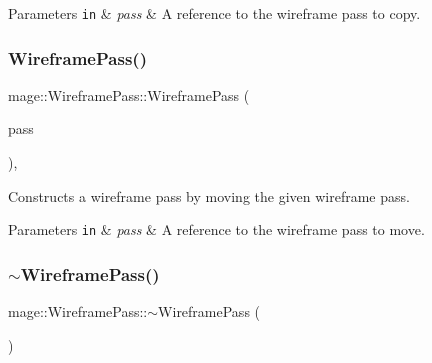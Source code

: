 \begin{DoxyParams}[1]{Parameters}
\mbox{\tt in}  & {\em pass} & A reference to the wireframe pass to copy. \\
\hline
\end{DoxyParams}
\hypertarget{classmage_1_1_wireframe_pass_afb86ef997be4e3a204ead228d6533519}{}\label{classmage_1_1_wireframe_pass_afb86ef997be4e3a204ead228d6533519} 
\subsubsection{\texorpdfstring{Wireframe\+Pass()}{WireframePass()}\hspace{0.1cm}{\footnotesize\ttfamily [3/3]}}
{\footnotesize\ttfamily mage\+::\+Wireframe\+Pass\+::\+Wireframe\+Pass (\begin{DoxyParamCaption}\item[{\hyperlink{classmage_1_1_wireframe_pass}{Wireframe\+Pass} \&\&}]{pass }\end{DoxyParamCaption})\hspace{0.3cm}{\ttfamily [default]}, {\ttfamily [noexcept]}}

Constructs a wireframe pass by moving the given wireframe pass.


\begin{DoxyParams}[1]{Parameters}
\mbox{\tt in}  & {\em pass} & A reference to the wireframe pass to move. \\
\hline
\end{DoxyParams}
\hypertarget{classmage_1_1_wireframe_pass_a186e4dd37ac17382872180385ec4dca1}{}\label{classmage_1_1_wireframe_pass_a186e4dd37ac17382872180385ec4dca1} 
\subsubsection{\texorpdfstring{$\sim$\+Wireframe\+Pass()}{~WireframePass()}}
{\footnotesize\ttfamily mage\+::\+Wireframe\+Pass\+::$\sim$\+Wireframe\+Pass (\begin{DoxyParamCaption}{ }\end{DoxyParamCaption})\hspace{0.3cm}{\ttfamily [default]}}

